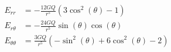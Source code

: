 \documentclass{article}
\begin{document}
 
\addtocounter{equation}{4}
\begin{align}
    E_{rr} &= - \frac{12 G Q}{r^{5}} \left(3 \cos^{2}{\left (\theta \right )} - 1\right) \\
    E_{r\theta} &= - \frac{24 G Q}{r^{5}} \sin{\left (\theta \right )} \cos{\left (\theta \right )} \\
    E_{\theta\theta} &= \frac{3 G Q}{r^{5}} \left(- \sin^{2}{\left (\theta \right )} + 6 \cos^{2}{\left (\theta \right )} - 2\right)
\end{align}
\end{document}
